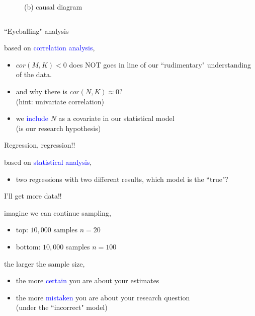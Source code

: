 \begin{frame}
\begin{columns}
\begin{column}{0.5\textwidth}
\begin{figure}
				\caption*{(b) causal diagram}
			\end{figure}
		\end{column}
	\end{columns}
\end{frame}
%
%
\begin{lhframe}[rhgraphic={\texttt{[image: pipe3\_panel.pdf]}}]
	{``Eyeballing" analysis}
	
	based on \textcolor{blue}{correlation analysis},
	\begin{itemize}
		\item $cor(M, K)<0$ does NOT goes in line of our ``rudimentary" understanding of the data.
		\item and why there is $cor(N, K) \approx 0$? \\
		{\small (hint: univariate correlation)}
		\item we \textcolor{blue}{include} $N$ as a covariate in our statistical model \\
		{\small (is our research hypothesis)}
	\end{itemize}
\end{lhframe}
%
%
\begin{lhframe}[rhgraphic={\texttt{[image: pipe3\_reg.png]}}]
	{Regression, regression!!}
	
	based on \textcolor{blue}{statistical analysis},
	\begin{itemize}
		\item two regressions with two different results, which model is the ``true"?
	\end{itemize}
\end{lhframe}
%
%
\begin{lhframe}[rhgraphic={\texttt{[image: pipe3\_samplesize.pdf]}}]
	{I'll get more data!!}
	
	imagine we can continue sampling,
	\begin{itemize}
		\item top: $10,000$ samples $n=20$
		\item bottom: $10,000$ samples $n=100$
	\end{itemize}
	
	the larger the sample size,
	\begin{itemize}
		\item the more \textcolor{blue}{certain} you are about your estimates
		\item the more \textcolor{blue}{mistaken} you are about your research question \\
		{\small (under the ``incorrect" model)}
	\end{itemize}
\end{lhframe}
